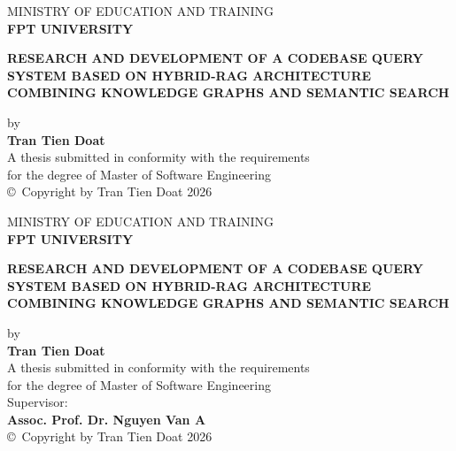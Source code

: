 \documentclass[12pt,a4paper,oneside]{report}
\begin{document}
\begin{titlepage}
    \begin{center}
        \large MINISTRY OF EDUCATION AND TRAINING \\
        \textbf{\large FPT UNIVERSITY} \\
        \vfill
        \vfill
        \begin{singlespace}
            \textbf{\Large RESEARCH AND DEVELOPMENT OF A CODEBASE QUERY SYSTEM BASED ON HYBRID-RAG ARCHITECTURE COMBINING KNOWLEDGE GRAPHS AND SEMANTIC SEARCH}
        \end{singlespace}
        \vfill
        \large by \\
        \large \textbf{Tran Tien Doat} \\
        \vfill
        \large A thesis submitted in conformity with the requirements \\
        for the degree of Master of Software Engineering \\
        \vfill
        \vfill
        \large \copyright\ Copyright by Tran Tien Doat 2026
    \end{center}
\end{titlepage}

\begin{titlepage}
    \begin{center}
        \large MINISTRY OF EDUCATION AND TRAINING \\
        \textbf{\large FPT UNIVERSITY} \\
        \vfill
        \vfill
        \begin{singlespace}
            \textbf{\Large RESEARCH AND DEVELOPMENT OF A CODEBASE QUERY SYSTEM BASED ON HYBRID-RAG ARCHITECTURE COMBINING KNOWLEDGE GRAPHS AND SEMANTIC SEARCH}
        \end{singlespace}
        \vfill
        \large by \\
        \large \textbf{Tran Tien Doat} \\
        \vfill
        \large A thesis submitted in conformity with the requirements \\
        for the degree of Master of Software Engineering \\
        \vfill
        \vfill
        \large Supervisor: \\
        \large \textbf{Assoc. Prof. Dr. Nguyen Van A} \\
        \vfill
        \large \copyright\ Copyright by Tran Tien Doat 2026
    \end{center}
\end{titlepage}
\end{document}
